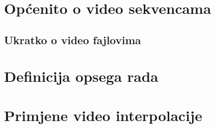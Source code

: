 \section{Op\'{c}enito o video sekvencama}
\lipsum[1-4]

\subsection{Ukratko o video fajlovima}
\lipsum[5]

\section{Definicija opsega rada}
\lipsum[6]

\section{Primjene video interpolacije}
\lipsum[7-9]